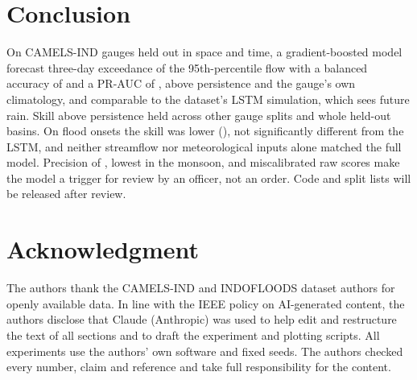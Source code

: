 \documentclass[conference]{IEEEtran}
\begin{document}
\section{Conclusion}
On CAMELS-IND gauges held out in space and time, a gradient-boosted model forecast three-day exceedance of the 95th-percentile flow with a balanced accuracy of \XgbBA{} and a PR-AUC of \XgbPR, above persistence and the gauge's own climatology, and comparable to the dataset's LSTM simulation, which sees future rain. Skill above persistence held across other gauge splits and whole held-out basins. On flood onsets the skill was lower (\OnXgbBA), not significantly different from the LSTM, and neither streamflow nor meteorological inputs alone matched the full model. Precision of \XgbPrec{}, lowest in the monsoon, and miscalibrated raw scores make the model a trigger for review by an officer, not an order. \LeakConclude{} Code and split lists will be released after review.

\section*{Acknowledgment}
The authors thank the CAMELS-IND and INDOFLOODS dataset authors for openly available data.
In line with the IEEE policy on AI-generated content, the authors disclose that Claude (Anthropic) was used to help edit and restructure the text of all sections and to draft the experiment and plotting scripts. All experiments use the authors' own software and fixed seeds. The authors checked every number, claim and reference and take full responsibility for the content.
\end{document}
